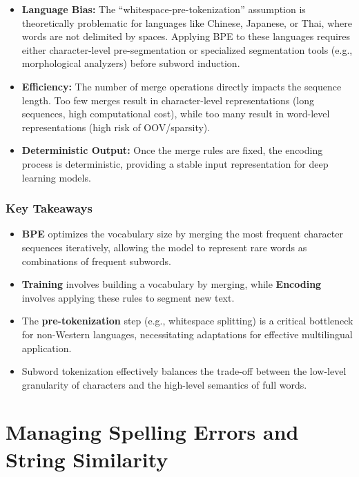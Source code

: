\documentclass[
  italian,
  11pt,
]{article}
\providecommand{\tightlist}{%
  \setlength{\itemsep}{0pt}\setlength{\parskip}{0pt}}
\begin{document}
\begin{itemize}
\tightlist
\item
  \textbf{Language Bias:} The ``whitespace-pre-tokenization'' assumption
  is theoretically problematic for languages like Chinese, Japanese, or
  Thai, where words are not delimited by spaces. Applying BPE to these
  languages requires either character-level pre-segmentation or
  specialized segmentation tools (e.g., morphological analyzers) before
  subword induction.
\item
  \textbf{Efficiency:} The number of merge operations directly impacts
  the sequence length. Too few merges result in character-level
  representations (long sequences, high computational cost), while too
  many result in word-level representations (high risk of OOV/sparsity).
\item
  \textbf{Deterministic Output:} Once the merge rules are fixed, the
  encoding process is deterministic, providing a stable input
  representation for deep learning models.
\end{itemize}

\subsubsection{Key Takeaways}\label{key-takeaways-3}

\begin{itemize}
\tightlist
\item
  \textbf{BPE} optimizes the vocabulary size by merging the most
  frequent character sequences iteratively, allowing the model to
  represent rare words as combinations of frequent subwords.
\item
  \textbf{Training} involves building a vocabulary by merging, while
  \textbf{Encoding} involves applying these rules to segment new text.
\item
  The \textbf{pre-tokenization} step (e.g., whitespace splitting) is a
  critical bottleneck for non-Western languages, necessitating
  adaptations for effective multilingual application.
\item
  Subword tokenization effectively balances the trade-off between the
  low-level granularity of characters and the high-level semantics of
  full words.
\end{itemize}

\newpage

\section{Managing Spelling Errors and String
Similarity}\label{managing-spelling-errors-and-string-similarity}
\end{document}
